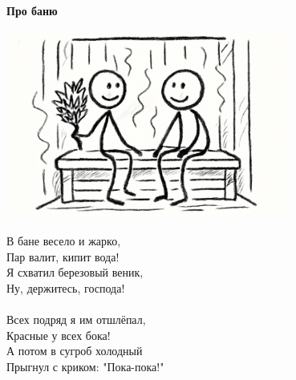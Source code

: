 \vspace*{\fill}
\begin{center}
  {\huge\textbf{Про баню}}

  \vspace{1.5em}  \includegraphics[width=0.7\textwidth]{pictures/bathhouse.png}
  \vspace{4em}
  \parbox{0.6\textwidth}{
    \LARGE
    \begin{spacing}{1.2}
      В бане весело и жарко,\\
      Пар валит, кипит вода!\\
      Я схватил березовый веник,\\
      Ну, держитесь, господа!\\
      \\
      Всех подряд я им отшлёпал,\\
      Красные у всех бока!\\
      А потом в сугроб холодный\\
      Прыгнул с криком: "Пока-пока!" %
    \end{spacing}
      
  }
\end{center}
\vspace*{\fill}